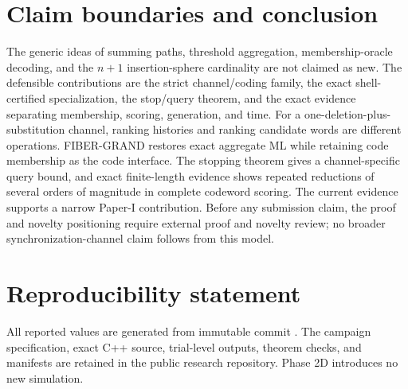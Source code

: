 \documentclass[conference]{IEEEtran}
\begin{document}
\section{Claim boundaries and conclusion}
The generic ideas of summing paths, threshold aggregation, membership-oracle decoding, and the
$n+1$ insertion-sphere cardinality are not claimed as new. The defensible contributions are the
strict channel/coding family, the exact shell-certified specialization, the stop/query theorem,
and the exact evidence separating membership, scoring, generation, and time. For a
one-deletion-plus-substitution channel, ranking histories and ranking candidate words are different
operations. FIBER-GRAND restores exact aggregate ML while retaining code membership as the code
interface. The stopping theorem gives a channel-specific query bound, and exact finite-length
evidence shows repeated reductions of several orders of magnitude in complete codeword scoring.
The current evidence supports a narrow Paper-I contribution. Before any submission claim, the proof
and novelty positioning require external proof and novelty review; no broader synchronization-channel
claim follows from this model.

\section*{Reproducibility statement}
All reported values are generated from immutable commit \texttt{\PhaseTwoCCommit}. The campaign
specification, exact C++ source, trial-level outputs, theorem checks, and manifests are retained in
the public research repository. Phase 2D introduces no new simulation.
\end{document}
